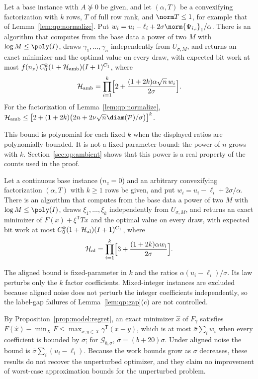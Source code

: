 \begin{theorem}\label{thm:qp:uniform}
Let a base instance with $A\not\succeq0$ be given, and let $(\alpha,T)$ be a
convexifying factorization with $k$ rows, $T$ of full row rank, and
$\norm T\le1$, for example that of Lemma~\ref{lem:qp:normalize}. Put
$w_i=u_i-\ell_i+2\sigma\norm{\Psi_{i,:}}_1/\alpha$. There is an algorithm that
computes from the base data a power of two $M$ with $\log M\le\poly(I)$, draws
$\gamma_1,\dots,\gamma_n$ independently from $U_{\sigma,M}$, and
returns an exact minimizer and the optimal value on every draw, with expected
bit work at most $f(n_z)\,C_0^k(1+\mathcal H_{\rm amb})(I+1)^{C_1}$, where
\[
 \mathcal H_{\rm amb}=\prod_{i=1}^k\Bigl[2+\frac{(1+2k)\alpha\sqrt n\,w_i}{2\sigma}\Bigr].
\]
For the factorization of Lemma~\ref{lem:qp:normalize},
$\mathcal H_{\rm amb}\le\bigl[2+(1+2k)\bigl(2n+2\nu\sqrt n\diam(\mathcal P)/\sigma\bigr)\bigr]^k$.
\end{theorem}

This bound is polynomial for each fixed $k$ when the displayed ratios are
polynomially bounded. It is not a fixed-parameter bound: the power of $n$
grows with $k$. Section~\ref{sec:qp:ambient} shows that this power is a real
property of the counts used in the proof.

\begin{theorem}\label{thm:qp:aligned}
Let a continuous base instance ($n_z=0$) and an arbitrary convexifying
factorization $(\alpha,T)$ with $k\ge1$ rows be given, and put
$w_i=u_i-\ell_i+2\sigma/\alpha$. There is an algorithm that computes from the
base data a power of two $M$ with $\log M\le\poly(I)$, draws
$\xi_1,\dots,\xi_k$ independently from $U_{\sigma,M}$, and returns an
exact minimizer of $F(x)+\xi^{\mathsf T} Tx$ and the optimal value on every draw,
with expected bit work at most $C_0^k(1+\mathcal H_{\rm al})(I+1)^{C_1}$, where
\[
 \mathcal H_{\rm al}=\prod_{i=1}^k\Bigl[3+\frac{(1+2k)\alpha w_i}{2\sigma}\Bigr].
\]
\end{theorem}

The aligned bound is fixed-parameter in $k$ and the ratios
$\alpha(u_i-\ell_i)/\sigma$. Its law perturbs only the $k$ factor
coefficients. Mixed-integer instances are excluded because aligned noise does
not perturb the integer coefficients independently, so the label-gap failures
of Lemma~\ref{lem:qp:gap}(c) are not controlled.

\begin{remark}\label{rem:qp:regret}
By Proposition~\ref{prop:model:regret}, an exact minimizer $\hat x$ of
$F_\gamma$ satisfies $F(\hat x)-\min_XF\le\max_{x,y\in X}\gamma^{\mathsf T}(x-y)$,
which is at most $\bar\sigma\sum_iw_i$ when every coefficient is bounded
by $\bar\sigma$; for $\mathcal G_{b,\sigma}$, $\bar\sigma=(b+20)\sigma$.
Under aligned noise the bound is $\bar\sigma\sum_i(u_i-\ell_i)$. Because the
work bounds grow as $\sigma$ decreases, these results do not recover the
unperturbed optimizer, and they claim no improvement of worst-case
approximation bounds for the unperturbed problem.
\end{remark}

